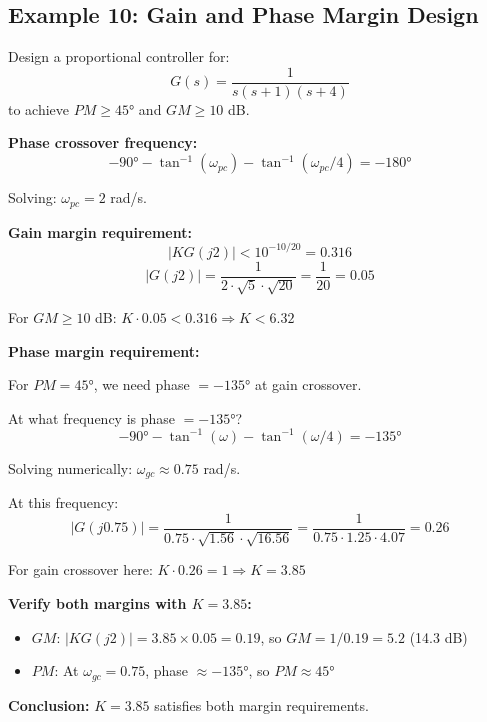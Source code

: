 \subsection{Example 10: Gain and Phase Margin Design}

\begin{example}
\label{ex:margin_design}
Design a proportional controller for:
\begin{equation}
G(s) = \frac{1}{s(s+1)(s+4)}
\end{equation}
to achieve $PM \geq 45°$ and $GM \geq 10$ dB.

\textbf{Phase crossover frequency:}
\begin{equation}
-90° - \tan^{-1}(\omega_{pc}) - \tan^{-1}(\omega_{pc}/4) = -180°
\end{equation}

Solving: $\omega_{pc} = 2$ rad/s.

\textbf{Gain margin requirement:}
\begin{equation}
|KG(j2)| < 10^{-10/20} = 0.316
\end{equation}
\begin{equation}
|G(j2)| = \frac{1}{2 \cdot \sqrt{5} \cdot \sqrt{20}} = \frac{1}{20} = 0.05
\end{equation}

For $GM \geq 10$ dB: $K \cdot 0.05 < 0.316 \Rightarrow K < 6.32$

\textbf{Phase margin requirement:}

For $PM = 45°$, we need phase $= -135°$ at gain crossover.

At what frequency is phase $= -135°$?
\begin{equation}
-90° - \tan^{-1}(\omega) - \tan^{-1}(\omega/4) = -135°
\end{equation}

Solving numerically: $\omega_{gc} \approx 0.75$ rad/s.

At this frequency:
\begin{equation}
|G(j0.75)| = \frac{1}{0.75 \cdot \sqrt{1.56} \cdot \sqrt{16.56}} = \frac{1}{0.75 \cdot 1.25 \cdot 4.07} = 0.26
\end{equation}

For gain crossover here: $K \cdot 0.26 = 1 \Rightarrow K = 3.85$

\textbf{Verify both margins with $K = 3.85$:}

\begin{itemize}
    \item $GM$: $|KG(j2)| = 3.85 \times 0.05 = 0.19$, so $GM = 1/0.19 = 5.2$ (14.3 dB) \checkmark
    \item $PM$: At $\omega_{gc} = 0.75$, phase $\approx -135°$, so $PM \approx 45°$ \checkmark
\end{itemize}

\textbf{Conclusion:} $K = 3.85$ satisfies both margin requirements.
\end{example}

